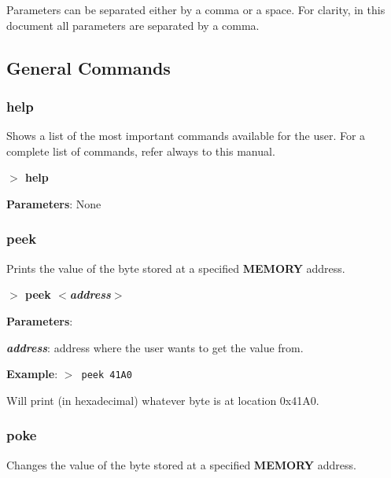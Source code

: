 \documentclass[a4paper,11pt]{article}
\begin{document}
    Parameters can be separated either by a comma or a space. For clarity, in
    this document all parameters are separated by a comma.

    \subsection{General Commands}\label{gencmds}
        \subsubsection{{\color{blue}help}}
        Shows a list of the most important commands available for the user.
        For a complete list of commands, refer always to this manual.

        \hspace{1.9cm}\textbf{$>$ help}

        \textbf{Parameters}: None

        \subsubsection{{\color{blue}peek}}
        Prints the value of the byte stored at a specified \textbf{MEMORY}
        address.

        \hspace{1.9cm}\textbf{$>$ peek \textit{$<$address$>$}}

        \textbf{Parameters}:

        \hspace{1cm}\textbf{\textit{address}}: address where the user wants
        to get the value from.

        \textbf{Example}: \texttt{$>$ peek 41A0}

        Will print (in hexadecimal) whatever byte is at location 0x41A0.

        \subsubsection{{\color{blue}poke}}
        Changes the value of the byte stored at a specified \textbf{MEMORY}
        address.
\end{document}
